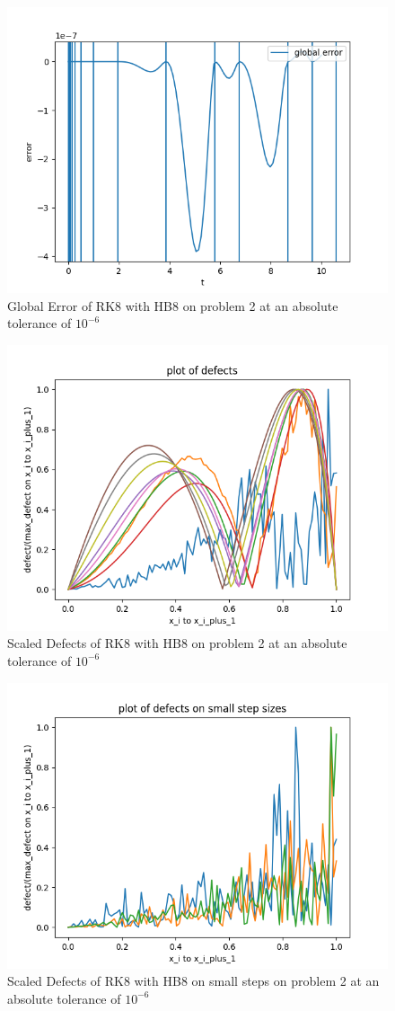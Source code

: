 \documentclass{article}
\begin{document}
\begin{figure}[H]
\centering
\includegraphics[width=0.7\linewidth]{./figures/rk8_with_hb8_p2_global_error}
\caption{Global Error of RK8 with HB8 on problem 2 at an absolute tolerance of $10^{-6}$}
\label{fig:rk8_with_hb8_p2_global_error}
\end{figure}

\begin{figure}[H]
\centering
\includegraphics[width=0.7\linewidth]{./figures/rk8_with_hb8_p2_scaled_defects}
\caption{Scaled Defects of RK8 with HB8 on problem 2 at an absolute tolerance of $10^{-6}$}
\label{fig:rk8_with_hb8_p2_scaled_defects}
\end{figure}

\begin{figure}[H]
\centering
\includegraphics[width=0.7\linewidth]{./figures/rk8_with_hb8_p2_scaled_defects_small_steps}
\caption{Scaled Defects of RK8 with HB8 on small steps on problem 2 at an absolute tolerance of $10^{-6}$}
\label{fig:rk8_with_hb8_p2_scaled_defects_small_steps}
\end{figure}
\end{document}
